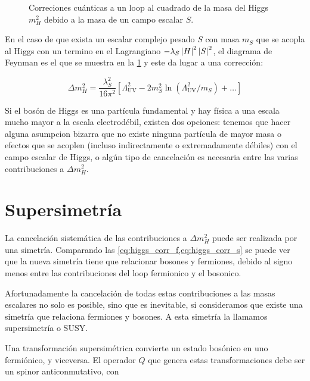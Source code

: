 \begin{figure}[h]
  \centering
  
  \caption{Correciones cu\'anticas a un loop al cuadrado de la masa del
    Higgs $m_H^2$ debido a la masa de un campo escalar $S$.}
  \label{fig:higgs_correction_s}
\end{figure}

En el caso de que exista un escalar complejo pesado $S$ con masa $m_S$
que se acopla al Higgs con un termino en el Lagrangiano
$-\lambda_S \left| H \right|^2 \left| S \right|^2$, el diagrama de Feynman es el que se
muestra en la \cref{fig:higgs_correction_s} y este da lugar a una
corrección:

\begin{equation}
  \Delta m_H^2 = \frac{\lambda_S^2}{16\pi^2} \left[ \Lambda^2_\text{UV} - 2 m_S^2 \ln (\Lambda^2_\text{UV}/m_S) +  \ldots \right]
  \label{eq:higgs_corr_s}
\end{equation}

Si el bosón de Higgs es una partícula fundamental y hay física a una
escala mucho mayor a la escala electrodébil, existen dos opciones:
tenemos que hacer alguna asumpcion bizarra que no existe ninguna
partícula de mayor masa o efectos que se acoplen (incluso indirectamente
o extremadamente débiles) con el campo escalar de Higgs, o algún tipo
de  cancelación es necesaria entre las varias contribuciones a $\Delta m_H^2$.

\section{Supersimetría}

La cancelación sistemática de las contribuciones a $\Delta m_H^2$ puede
ser realizada por una simetría. Comparando las \cref{eq:higgs_corr_f,eq:higgs_corr_s}
se puede ver que la nueva simetría tiene que relacionar bosones y fermiones,
debido al signo menos entre las contribuciones del loop fermionico y el
bosonico.

Afortunadamente la cancelación de todas estas contribuciones a las masas
escalares no solo es posible, sino que es inevitable, si consideramos
que existe una simetría que relaciona fermiones y bosones.
A esta simetría la llamamos supersimetría o SUSY.

Una transformación supersimétrica convierte un estado bosónico en uno
fermiónico, y viceversa. El operador $Q$ que genera estas transformaciones
debe ser un spinor anticonmutativo, con

